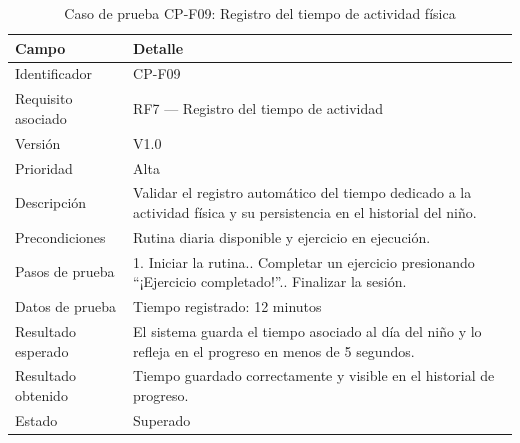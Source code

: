 				\begin{table}[H]
					\centering\small
					\caption{Caso de prueba CP-F09: Registro del tiempo de actividad física}
					\label{tab:cpf09}
					\begin{tabular}{p{3cm}p{12.0cm}}
						\hline
						\textbf{Campo} & \textbf{Detalle}\\
						\hline
						Identificador & CP-F09\\
						Requisito asociado & RF7 --- Registro del tiempo de actividad\\
						Versión & V1.0\\
						Prioridad & Alta\\
						Descripción & Validar el registro automático del tiempo dedicado a la actividad física y su persistencia en el historial del niño.\\
						Precondiciones & Rutina diaria disponible y ejercicio en ejecución.\\
						Pasos de prueba & 1. Iniciar la rutina.\newline 2. Completar un ejercicio presionando ``¡Ejercicio completado!''.\newline 3. Finalizar la sesión.\\
						Datos de prueba & Tiempo registrado: 12 minutos\\
						Resultado esperado & El sistema guarda el tiempo asociado al día del niño y lo refleja en el progreso en menos de 5 segundos.\\
						Resultado obtenido & Tiempo guardado correctamente y visible en el historial de progreso.\\
						Estado & Superado\\
						\hline
					\end{tabular}
				\end{table}
				\tblnote
				
